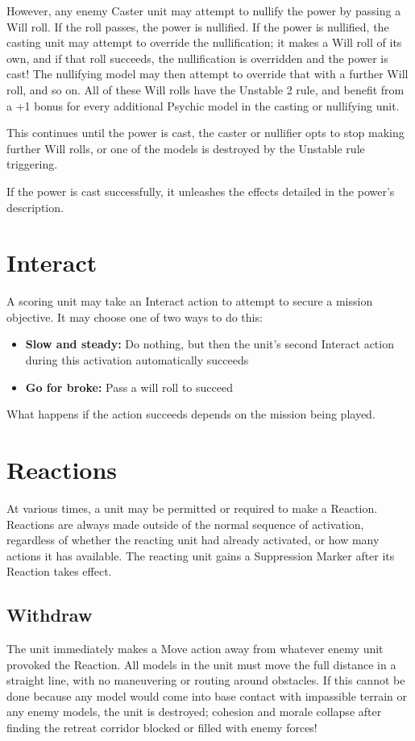 \begin{multicols}{2}
However, any enemy Caster unit may attempt to nullify the power by passing a Will roll. If the roll passes, the power is nullified. If the power is nullified, the casting unit may attempt to override the nullification; it makes a Will roll of its own, and if that roll succeeds, the nullification is overridden and the power is cast! The nullifying model may then attempt to override that with a further Will roll, and so on. All of these Will rolls have the Unstable 2 rule, and benefit from a +1 bonus for every additional Psychic model in the casting or nullifying unit.

This continues until the power is cast, the caster or nullifier opts to stop making further Will rolls, or one of the models is destroyed by the Unstable rule triggering.

If the power is cast successfully, it unleashes the effects detailed in the power's description.




\section*{Interact}
A scoring unit may take an Interact action to attempt to secure a mission objective. It may choose one of two ways to do this:
\begin{itemize}
    \item \textbf{Slow and steady:} Do nothing, but then the unit's second Interact action during this activation automatically succeeds
    \item \textbf{Go for broke:} Pass a will roll to succeed
\end{itemize}

What happens if the action succeeds depends on the mission being played.




\section*{Reactions}
At various times, a unit may be permitted or required to make a Reaction. Reactions are always made outside of the normal sequence of activation, regardless of whether the reacting unit had already activated, or how many actions it has available. The reacting unit gains a Suppression Marker after its Reaction takes effect.



\subsection*{Withdraw}
The unit immediately makes a Move action away from whatever enemy unit provoked the Reaction. All models in the unit must move the full distance in a straight line, with no maneuvering or routing around obstacles. If this cannot be done because any model would come into base contact with impassible terrain or any enemy models, the unit is destroyed; cohesion and morale collapse after finding the retreat corridor blocked or filled with enemy forces!




\end{multicols}
